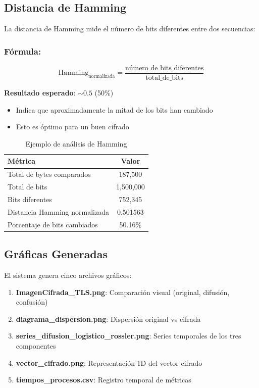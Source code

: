 \documentclass[12pt,a4paper]{article}
\begin{document}
\subsection{Distancia de Hamming}

La distancia de Hamming mide el número de bits diferentes entre dos secuencias:

\subsubsection*{Fórmula:}
\begin{equation}
\text{Hamming}_{\text{normalizada}} = \frac{\text{número\_de\_bits\_diferentes}}{\text{total\_de\_bits}}
\label{eq:hamming}
\end{equation}

\textbf{Resultado esperado}: $\sim 0.5$ (50\%)
\begin{itemize}
    \item Indica que aproximadamente la mitad de los bits han cambiado
    \item Esto es óptimo para un buen cifrado
\end{itemize}

\begin{table}[H]
\centering
\caption{Ejemplo de análisis de Hamming}
\label{tab:hamming}
\begin{tabular}{@{}lc@{}}
\toprule
\textbf{Métrica} & \textbf{Valor} \\ \midrule
Total de bytes comparados & 187,500 \\
Total de bits & 1,500,000 \\
Bits diferentes & 752,345 \\
Distancia Hamming normalizada & 0.501563 \\
Porcentaje de bits cambiados & 50.16\% \\ \bottomrule
\end{tabular}
\end{table}

\subsection{Gráficas Generadas}

El sistema genera cinco archivos gráficos:

\begin{enumerate}
    \item \textbf{ImagenCifrada\_TLS.png}: Comparación visual (original, difusión, confusión)
    \item \textbf{diagrama\_dispersion.png}: Dispersión original vs cifrada
    \item \textbf{series\_difusion\_logistico\_rossler.png}: Series temporales de los tres componentes
    \item \textbf{vector\_cifrado.png}: Representación 1D del vector cifrado
    \item \textbf{tiempos\_procesos.csv}: Registro temporal de métricas
\end{enumerate}
\end{document}
